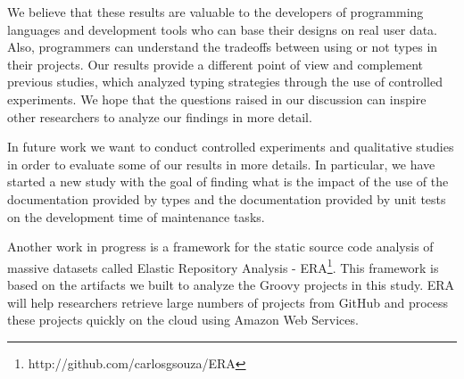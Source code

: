 \documentclass[msc]{ppgccufmg}
\begin{document}
We believe that these results are valuable to the developers of programming languages and development tools who can base their designs on real user data.
Also, programmers can understand the tradeoffs between using or not types in their projects.
Our results provide a different point of view and complement previous studies, which analyzed typing strategies through the use of controlled experiments. 
We hope that the questions raised in our discussion can inspire other researchers to analyze our findings in more detail.

In future work we want to conduct controlled experiments and qualitative studies in order to evaluate some of our results in more details.
In particular, we have started a new study with the goal of finding what is the impact of the use of the documentation provided by types and the documentation provided by unit tests on the development time of maintenance tasks.

Another work in progress is a framework for the static source code analysis of massive datasets called Elastic Repository Analysis - ERA\footnote{http://github.com/carlosgsouza/ERA}.
This framework is based on the artifacts we built to analyze the Groovy projects in this study.
ERA will help researchers retrieve large numbers of projects from GitHub and process these projects quickly on the cloud using Amazon Web Services.



\end{document}
